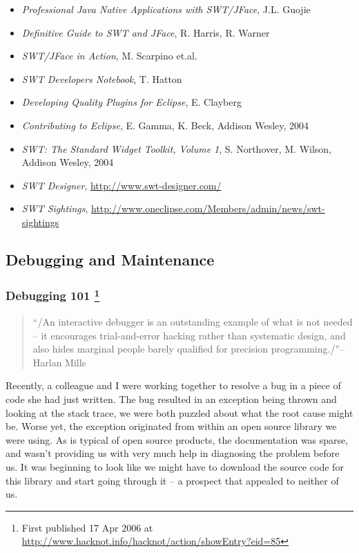 \documentclass{article}
\begin{document}
\begin{enumerate}
\begin{enumerate}
\begin{itemize}
\item \emph{Professional Java Native Applications with SWT/JFace}, J.L. Guojie
\item \emph{Definitive Guide to SWT and JFace}, R. Harris, R. Warner
\item \emph{SWT/JFace in Action}, M. Scarpino et.al.
\item \emph{SWT Developers Notebook}, T. Hatton
\item \emph{Developing Quality Plugins for Eclipse}, E. Clayberg
\item \emph{Contributing to Eclipse}, E. Gamma, K. Beck, Addison Wesley, 2004
\item \emph{SWT: The Standard Widget Toolkit, Volume 1}, S. Northover, M.
Wilson, Addison Wesley, 2004
\item \emph{SWT Designer}, \url{http://www.swt-designer.com/}
\item \emph{SWT Sightings},
\url{http://www.oneclipse.com/Members/admin/news/swt-sightings}
\end{itemize}
\end{enumerate}
\end{enumerate}

\subsection{Debugging and Maintenance}
\label{sec:orgheadline345}

\subsubsection{Debugging 101 \footnote{First published 17 Apr 2006 at
\url{http://www.hacknot.info/hacknot/action/showEntry?eid=85}}}
\label{sec:orgheadline336}

\begin{quote}
“/An interactive debugger is an outstanding example of what is not
needed -- it encourages trial-and-error hacking rather than systematic
design, and also hides marginal people barely qualified for precision
programming./”-- Harlan Mills
\end{quote}

Recently, a colleague and I were working together to resolve a bug in a
piece of code she had just written. The bug resulted in an exception
being thrown and looking at the stack trace, we were both puzzled about
what the root cause might be. Worse yet, the exception originated from
within an open source library we were using. As is typical of open
source products, the documentation was sparse, and wasn't providing us
with very much help in diagnosing the problem before us. It was
beginning to look like we might have to download the source code for
this library and start going through it -- a prospect that appealed to
neither of us.
\end{document}
